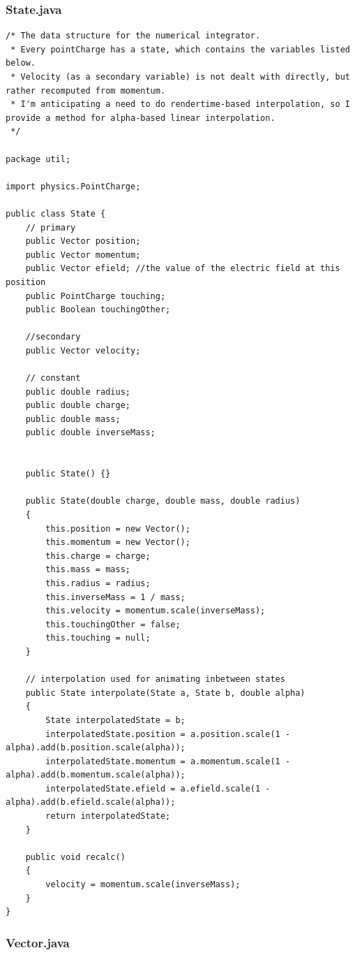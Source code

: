 \documentclass[10pt]{article}
\begin{document}
\subsubsection{State.java}

\begin{verbatim}
/* The data structure for the numerical integrator.
 * Every pointCharge has a state, which contains the variables listed below.
 * Velocity (as a secondary variable) is not dealt with directly, but rather recomputed from momentum.
 * I'm anticipating a need to do rendertime-based interpolation, so I provide a method for alpha-based linear interpolation.
 */

package util;

import physics.PointCharge;

public class State {
	// primary
	public Vector position;
	public Vector momentum;
	public Vector efield; //the value of the electric field at this position
	public PointCharge touching;
	public Boolean touchingOther;

	//secondary
	public Vector velocity;
	
	// constant
	public double radius;
	public double charge;
	public double mass;
	public double inverseMass;


	public State() {}

	public State(double charge, double mass, double radius) 
	{
		this.position = new Vector();
		this.momentum = new Vector();
		this.charge = charge;
		this.mass = mass;
		this.radius = radius;
		this.inverseMass = 1 / mass;
		this.velocity = momentum.scale(inverseMass);
		this.touchingOther = false;
		this.touching = null;
	}

	// interpolation used for animating inbetween states
	public State interpolate(State a, State b, double alpha) 
	{
		State interpolatedState = b;
		interpolatedState.position = a.position.scale(1 - alpha).add(b.position.scale(alpha));
		interpolatedState.momentum = a.momentum.scale(1 - alpha).add(b.momentum.scale(alpha));
		interpolatedState.efield = a.efield.scale(1 - alpha).add(b.efield.scale(alpha));
		return interpolatedState;
	}
	
	public void recalc()
	{
		velocity = momentum.scale(inverseMass);
	}
}
\end{verbatim}

\subsubsection{Vector.java}
\end{document}
